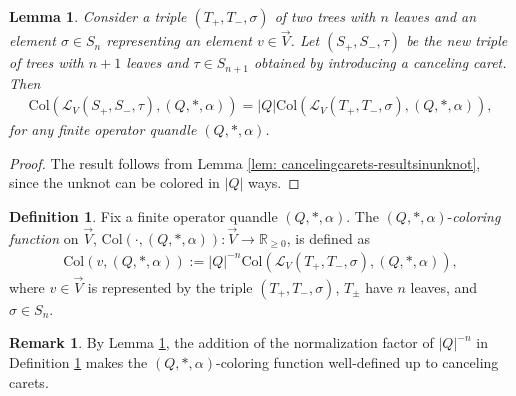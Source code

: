 \documentclass[11pt, twoside]{amsart}
\numberwithin{equation}{section}
\newtheorem{lemma}[theorem]{Lemma}
\theoremstyle{definition}
\newtheorem{definition}[theorem]{Definition}
\newtheorem{remark}[theorem]{Remark}
\numberwithin{equation}{section}
\begin{document}
\begin{lemma}\label{lem: numberofopqcoloringswithcarets}
    Consider a triple $(T_+, T_-, \sigma)$ of two trees with $n$ leaves and an element $\sigma \in S_n$ representing an element $v \in \vec{V}$. Let $(S_+, S_-, \tau)$ be the new triple of trees with $n+1$ leaves and $\tau \in S_{n+1}$ obtained by introducing a canceling caret. Then
    \begin{align*}
        \text{Col}(\mathscr{L}_{V}(S_+,S_-,\tau), (Q, *,\alpha))=|Q|\text{Col}(\mathscr{L}_{V}(T_+,T_-,\sigma), (Q,*,\alpha)),
    \end{align*}
    for any finite operator quandle $(Q,*,\alpha)$.
\end{lemma}

\begin{proof}
    The result follows from Lemma \ref{lem: cancelingcarets-resultsinunknot}, since the unknot can be colored in $|Q|$  ways. \qedhere
\end{proof}

\begin{definition}\label{def: oq-positive-type}
    Fix a finite operator quandle $(Q,*,\alpha)$. The $(Q,*,\alpha)$-\textit{coloring function} on $\vec{V}$, $\text{Col}(\cdot, (Q,*,\alpha)):\vec{V}\to \mathbb{R}_{\geq 0}$, is defined as
    \begin{align*}
        \text{Col}(v, (Q,*,\alpha)) := |Q|^{-n}\text{Col}(\mathscr{L}_{V}(T_+, T_-,\sigma), (Q,*,\alpha)),
    \end{align*}
    where $v \in \vec{V}$ is represented by the triple $(T_+, T_-,\sigma)$, $T_{\pm}$ have $n$ leaves, and $\sigma\in S_n$. 
\end{definition}

\begin{remark}\label{rmk: well-defined-positive-function}
    By Lemma \ref{lem: numberofopqcoloringswithcarets}, the addition of the normalization factor of $|Q|^{-n}$ in Definition \ref{def: oq-positive-type} makes the $(Q,*,\alpha)$-coloring function well-defined up to canceling carets. 
\end{remark}
\end{document}
